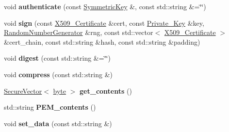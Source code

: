 \begin{DoxyCompactItemize}
\item 
\hypertarget{classBotan_1_1CMS__Encoder_adf2de32c64f3e42c1f164d3f1f4471c9}{void {\bfseries authenticate} (const \hyperlink{namespaceBotan_a00c78597211d5c63b63e2a57ddb96d38}{Symmetric\-Key} \&, const std\-::string \&=\char`\"{}\char`\"{})}\label{classBotan_1_1CMS__Encoder_adf2de32c64f3e42c1f164d3f1f4471c9}

\item 
\hypertarget{classBotan_1_1CMS__Encoder_a977e1df47741091f19e83f74e3f760e8}{void {\bfseries sign} (const \hyperlink{classBotan_1_1X509__Certificate}{X509\-\_\-\-Certificate} \&cert, const \hyperlink{classBotan_1_1Private__Key}{Private\-\_\-\-Key} \&key, \hyperlink{classBotan_1_1RandomNumberGenerator}{Random\-Number\-Generator} \&rng, const std\-::vector$<$ \hyperlink{classBotan_1_1X509__Certificate}{X509\-\_\-\-Certificate} $>$ \&cert\-\_\-chain, const std\-::string \&hash, const std\-::string \&padding)}\label{classBotan_1_1CMS__Encoder_a977e1df47741091f19e83f74e3f760e8}

\item 
\hypertarget{classBotan_1_1CMS__Encoder_a6bb435dc936b7d6efed6b417ff478171}{void {\bfseries digest} (const std\-::string \&=\char`\"{}\char`\"{})}\label{classBotan_1_1CMS__Encoder_a6bb435dc936b7d6efed6b417ff478171}

\item 
\hypertarget{classBotan_1_1CMS__Encoder_a517f2125a9e9c23ebe6d3d63f9c53be0}{void {\bfseries compress} (const std\-::string \&)}\label{classBotan_1_1CMS__Encoder_a517f2125a9e9c23ebe6d3d63f9c53be0}

\item 
\hypertarget{classBotan_1_1CMS__Encoder_ab8a9dbc2118fd3c0a123526907e984f8}{\hyperlink{classBotan_1_1SecureVector}{Secure\-Vector}$<$ \hyperlink{namespaceBotan_a7d793989d801281df48c6b19616b8b84}{byte} $>$ {\bfseries get\-\_\-contents} ()}\label{classBotan_1_1CMS__Encoder_ab8a9dbc2118fd3c0a123526907e984f8}

\item 
\hypertarget{classBotan_1_1CMS__Encoder_ad4c4c865201f2e834106b7185fe4216f}{std\-::string {\bfseries P\-E\-M\-\_\-contents} ()}\label{classBotan_1_1CMS__Encoder_ad4c4c865201f2e834106b7185fe4216f}

\item 
\hypertarget{classBotan_1_1CMS__Encoder_a71262c86cb9fa0387b2142acbcccabf1}{void {\bfseries set\-\_\-data} (const std\-::string \&)}\label{classBotan_1_1CMS__Encoder_a71262c86cb9fa0387b2142acbcccabf1}


\end{DoxyCompactItemize}
